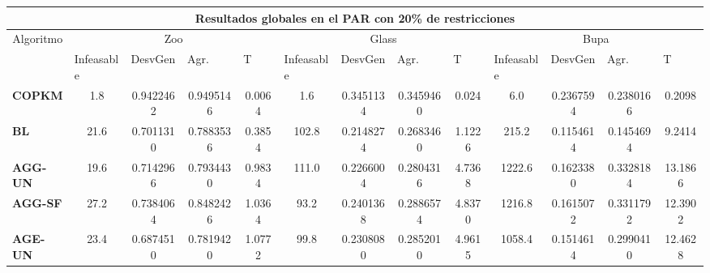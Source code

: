 \begin{table}[H]
	\tiny

	\begin{adjustwidth}{-1cm}{-1cm}%
	
	\begin{tabular}{|l|c|c|c|c|c|c|c|c|c|c|c|c|}
	\hline
	\multicolumn{13}{|c|}{\textbf{Resultados globales en el PAR con 20\% de restricciones}}                                                                                                                                                                                                                                                                                                                                            \\ \hline
	\multicolumn{1}{|c|}{\multirow{2}{*}{Algoritmo}} & \multicolumn{4}{c|}{Zoo}                                                                                          & \multicolumn{4}{c|}{Glass}                                                                                         & \multicolumn{4}{c|}{Bupa}                                                                                          \\ \cline{2-13} 
	\multicolumn{1}{|c|}{}                                  & \multicolumn{1}{l|}{Infeasable} & \multicolumn{1}{l|}{DesvGen} & \multicolumn{1}{l|}{Agr.} & \multicolumn{1}{l|}{T} & \multicolumn{1}{l|}{Infeasable} & \multicolumn{1}{l|}{DesvGen} & \multicolumn{1}{l|}{Agr.} & \multicolumn{1}{l|}{T} & \multicolumn{1}{l|}{Infeasable} & \multicolumn{1}{l|}{DesvGen} & \multicolumn{1}{l|}{Agr.} & \multicolumn{1}{l|}{T} \\ \hline
	\textbf{COPKM}     & 1.8 & 0.9422462 &  0.9495146  & 0.0064      						 & 1.6 & 0.3451134 & 0.3459460 & 0.024     & 6.0 & 0.2367594 & 0.2380166 & 0.2098  \\ \hline
	\textbf{BL}   	   & 21.6 & 0.7011310 & 0.7883536 & 0.3854     							& 102.8 & 0.2148274 & 0.2683460 & 1.1226 & 215.2 & 0.1154614 & 0.1454694 & 9.2414 		\\ \hline
	\textbf{AGG-UN}    & 19.6 & 	0.7142966 & 	0.7934430 & 	0.9834 					& 	111.0 & 	0.2266004 & 	0.2804316 & 	4.7368 & 	1222.6	 & 0.1623380 & 	0.3328184 & 	13.1866		\\ \hline
	\textbf{AGG-SF}    &  27.2 & 	0.7384064 & 	0.8482426 & 	1.0364 					& 	93.2 & 	0.2401368 & 	0.2886574 & 	4.8370 & 	1216.8	 & 0.1615072 & 	0.3311792	 & 12.3902	\\ \hline
	\textbf{AGE-UN}    &  23.4 & 	0.6874510 & 	0.7819420 & 	1.0772 					& 	99.8 & 	0.2308080 & 	0.2852010 & 	4.9615	 & 1058.4 & 	0.1514614 & 	0.2990410 & 	12.4628	\\ \hline

\end{tabular}
\end{adjustwidth}
\end{table}
